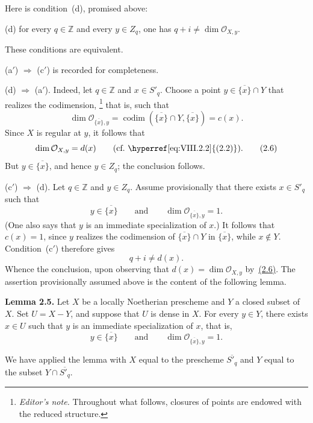 \documentclass[11pt,a4paper,oneside]{book}
\providecommand{\markedfootnote}[2]{%
  \begingroup\renewcommand{\thefootnote}{#1}\footnote{#2}\endgroup}
\providecommand{\cO}{\mathcal O}
\providecommand{\codim}{\operatorname{codim}}
\theoremstyle{plain}
\theoremstyle{definition}
\theoremstyle{remark}
\begin{document}
\medskip
\noindent Here is condition~(d), promised above:

\medskip
\noindent\textup{(d)} for every $q\in\mathbb Z$ and every $y\in Z_q$,
one has $q+i\ne\dim\cO_{X,y}$.

\medskip
\noindent These conditions are equivalent.

\smallskip
\noindent\textup{(a$'$)} $\Rightarrow$ \textup{(c$'$)} is recorded for
completeness.

\smallskip
\noindent\textup{(d)} $\Rightarrow$ \textup{(a$'$)}. Indeed, let
$q\in\mathbb Z$ and $x\in S'_q$. Choose a point
$y\in\overline{\{x\}}\cap Y$ that realizes the
codimension,\markedfootnote{(6)}{\textit{Editor's note.} Throughout what
follows, closures of points are endowed with the reduced structure.} that is,
such that
\begin{equation}\label{eq:VIII.2.5}
  \dim\cO_{\overline{\{x\}},y}
  =\codim(\overline{\{x\}}\cap Y,\overline{\{x\}})=c(x).
  \tag{2.5}
\end{equation}
Since $X$ is regular at $y$, it follows that
\begin{equation}\label{eq:VIII.2.6}
  \dim\cO_{X,y}=d(x)\qquad\text{(cf.~\hyperref[eq:VIII.2.2]{(2.2)}).}
  \tag{2.6}
\end{equation}
But $y\in\overline{\{x\}}$, and hence $y\in Z_q$; the conclusion follows.

\smallskip
\noindent\textup{(c$'$)} $\Rightarrow$ \textup{(d)}. Let $q\in\mathbb Z$
and $y\in Z_q$. Assume provisionally that there exists $x\in S'_q$ such
that
\[
  y\in\overline{\{x\}}\qquad\text{and}\qquad
  \dim\cO_{\overline{\{x\}},y}=1.
\]
(One also says that $y$ is an immediate specialization of $x$.) It follows
that $c(x)=1$, since $y$ realizes the codimension of
$\overline{\{x\}}\cap Y$ in $\overline{\{x\}}$, while $x\notin Y$.
Condition~\textup{(c$'$)} therefore gives
\[
  q+i\ne d(x).
\]
Whence the conclusion, upon observing that $d(x)=\dim\cO_{X,y}$ by~\hyperref[eq:VIII.2.6]{(2.6)}.
The assertion provisionally assumed above is the content of the following
lemma.

\medskip
{}\noindent\textbf{Lemma 2.5.} Let $X$ be a locally Noetherian prescheme and
$Y$ a closed subset of $X$. Set $U=X-Y$, and suppose that $U$ is dense in
$X$. For every $y\in Y$, there exists $x\in U$ such that $y$ is an immediate
specialization of $x$, that is,
\[
  y\in\overline{\{x\}}\qquad\text{and}\qquad
  \dim\cO_{\overline{\{x\}},y}=1.
\]

We have applied the lemma with $X$ equal to the prescheme
$\overline{S'_q}$ and $Y$ equal to the subset
$Y\cap\overline{S'_q}$.
\end{document}
